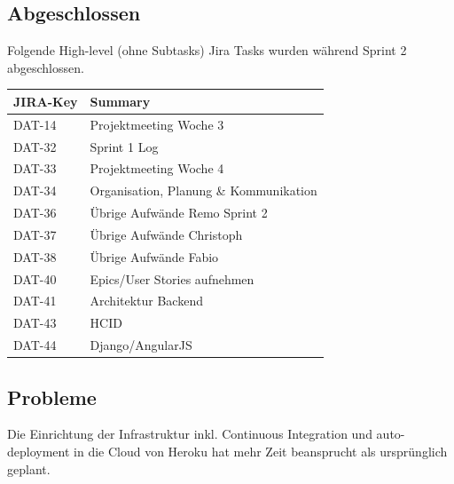 \subsection*{Abgeschlossen}
Folgende High-level (ohne Subtasks) Jira Tasks wurden während Sprint 2 abgeschlossen.

\begin{table}[H]
\centering
\begin{tabular}{ll}
	\toprule
	\textbf{JIRA-Key} & \textbf{Summary}\\
	\midrule
		DAT-14 & Projektmeeting Woche 3\\
		DAT-32 & Sprint 1 Log\\
		DAT-33 & Projektmeeting Woche 4\\
		DAT-34 & Organisation, Planung \& Kommunikation\\
		DAT-36 & Übrige Aufwände Remo Sprint 2\\
		DAT-37 & Übrige Aufwände Christoph\\
		DAT-38 & Übrige Aufwände Fabio\\
		DAT-40 & Epics/User Stories aufnehmen\\
		DAT-41 & Architektur Backend\\
		DAT-43 & HCID\\
		DAT-44 & Django/AngularJS\\
	\bottomrule
\end{tabular}	
\end{table}

\subsection*{Probleme}
Die Einrichtung der Infrastruktur inkl. Continuous Integration und auto-deployment in die Cloud von Heroku hat mehr Zeit beansprucht als ursprünglich geplant.